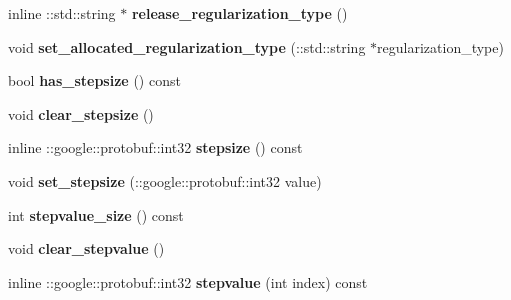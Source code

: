 \begin{DoxyCompactItemize}
\mbox{\label{classcaffe_1_1_solver_parameter_aba46599a39bb83c58e65899225ea8db1}} 
inline \+::std\+::string $\ast$ {\bfseries release\+\_\+regularization\+\_\+type} ()
\item 
\mbox{\label{classcaffe_1_1_solver_parameter_a4ac3509465977400abb06dd83c7c898e}} 
void {\bfseries set\+\_\+allocated\+\_\+regularization\+\_\+type} (\+::std\+::string $\ast$regularization\+\_\+type)
\item 
\mbox{\label{classcaffe_1_1_solver_parameter_a129f5e6c3b5dccec61f7d1381e0a44e8}} 
bool {\bfseries has\+\_\+stepsize} () const
\item 
\mbox{\label{classcaffe_1_1_solver_parameter_a8164e59be6b5cd54c332eae92252402f}} 
void {\bfseries clear\+\_\+stepsize} ()
\item 
\mbox{\label{classcaffe_1_1_solver_parameter_a6f5e51fb44875641d88c67d3d4334797}} 
inline \+::google\+::protobuf\+::int32 {\bfseries stepsize} () const
\item 
\mbox{\label{classcaffe_1_1_solver_parameter_a3afaa4869c82d940a43d7cd5005d7271}} 
void {\bfseries set\+\_\+stepsize} (\+::google\+::protobuf\+::int32 value)
\item 
\mbox{\label{classcaffe_1_1_solver_parameter_abb416cc00ea121c5ccb2a37a687c9618}} 
int {\bfseries stepvalue\+\_\+size} () const
\item 
\mbox{\label{classcaffe_1_1_solver_parameter_a41612c04774a8d8f3929df47526ab341}} 
void {\bfseries clear\+\_\+stepvalue} ()
\item 
\mbox{\label{classcaffe_1_1_solver_parameter_ad9ed10c0ecbffcd50fe571b7deaa912a}} 
inline \+::google\+::protobuf\+::int32 {\bfseries stepvalue} (int index) const
\item 
\mbox{\label{classcaffe_1_1_solver_parameter_a25677beacf1289c7bc6a3d617a53e0c7}} 

\end{DoxyCompactItemize}
